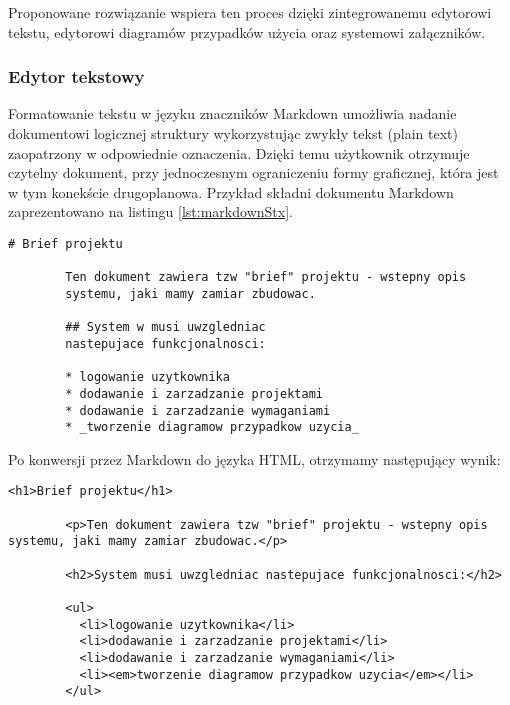       Proponowane rozwiązanie wspiera ten proces dzięki zintegrowanemu edytorowi tekstu, edytorowi diagramów przypadków użycia oraz systemowi załączników.
      

      \subsubsection{Edytor tekstowy}

      Formatowanie tekstu w języku znaczników Markdown \cite{Grub04} umożliwia nadanie dokumentowi logicznej struktury wykorzystując zwykły tekst (plain text) zaopatrzony w odpowiednie oznaczenia. Dzięki temu użytkownik otrzymuje czytelny dokument, przy jednoczesnym ograniczeniu formy graficznej, która jest w tym konekście drugoplanowa. Przykład składni dokumentu Markdown zaprezentowano na listingu \ref{lst:markdownStx}.

      \begin{lstlisting}[caption={przykład składni języka Markdown}, label={lst:markdownStx}]
        # Brief projektu

        Ten dokument zawiera tzw "brief" projektu - wstepny opis 
        systemu, jaki mamy zamiar zbudowac.

        ## System w musi uwzgledniac 
        nastepujace funkcjonalnosci:
       
        * logowanie uzytkownika
        * dodawanie i zarzadzanie projektami
        * dodawanie i zarzadzanie wymaganiami
        * _tworzenie diagramow przypadkow uzycia_
      \end{lstlisting}
      
      Po konwersji przez Markdown do języka HTML, otrzymamy następujący wynik:

      \begin{lstlisting}[caption={wynik konwersji powyższego kodu do HTML}, label={lst:markDownCompile}]
        <h1>Brief projektu</h1>

        <p>Ten dokument zawiera tzw "brief" projektu - wstepny opis systemu, jaki mamy zamiar zbudowac.</p>

        <h2>System musi uwzgledniac nastepujace funkcjonalnosci:</h2>

        <ul>
          <li>logowanie uzytkownika</li>
          <li>dodawanie i zarzadzanie projektami</li>
          <li>dodawanie i zarzadzanie wymaganiami</li>
          <li><em>tworzenie diagramow przypadkow uzycia</em></li>
        </ul>
      \end{lstlisting}
  
